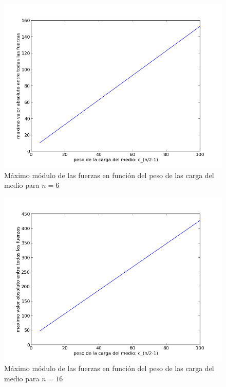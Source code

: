 \begin{figure}[!h]
	\begin{center}
		  \includegraphics[scale=0.4]{Imagenes/variable_cis/just_middle_ci/just_middle_ci_n_6}
		  \caption{Máximo módulo de las fuerzas en función del peso de las carga del medio para $n=6$}
		  \label{fig:contra1}
	\end{center}
\end{figure}

\begin{figure}[!h]
	\begin{center}
		  \includegraphics[scale=0.4]{Imagenes/variable_cis/just_middle_ci/just_middle_ci_n_16}
		  \caption{Máximo módulo de las fuerzas en función del peso de las carga del medio para $n=16$}
		  \label{fig:contra1}
	\end{center}
\end{figure}

